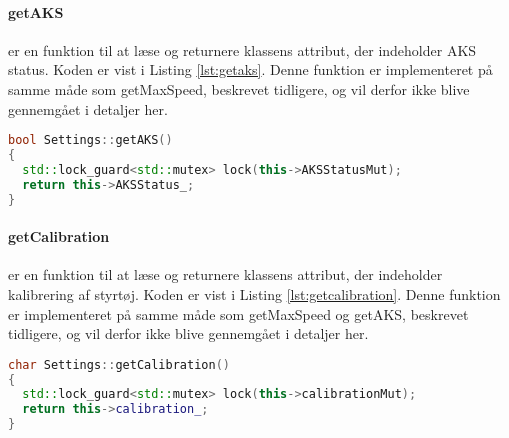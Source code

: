 \paragraph{getAKS}  er en funktion til at læse og returnere klassens attribut, der indeholder AKS status. Koden er vist i Listing \ref{lst:getaks}. Denne funktion er implementeret på samme måde som getMaxSpeed, beskrevet tidligere, og vil derfor ikke blive gennemgået i detaljer her.

\begin{lstlisting}[caption={Funktionen getAKS},label=lst:getaks, language=c++]
bool Settings::getAKS()
{
  std::lock_guard<std::mutex> lock(this->AKSStatusMut);
  return this->AKSStatus_;
}
\end{lstlisting}


\paragraph{getCalibration}  er en funktion til at læse og returnere klassens attribut, der indeholder kalibrering af styrtøj. Koden er vist i Listing \ref{lst:getcalibration}. Denne funktion er implementeret på samme måde som getMaxSpeed og getAKS, beskrevet tidligere, og vil derfor ikke blive gennemgået i detaljer her.

\begin{lstlisting}[caption={Funktionen getCalibration},label=lst:getcalibration, language=c++]
char Settings::getCalibration()
{
  std::lock_guard<std::mutex> lock(this->calibrationMut);
  return this->calibration_;
}
\end{lstlisting}
